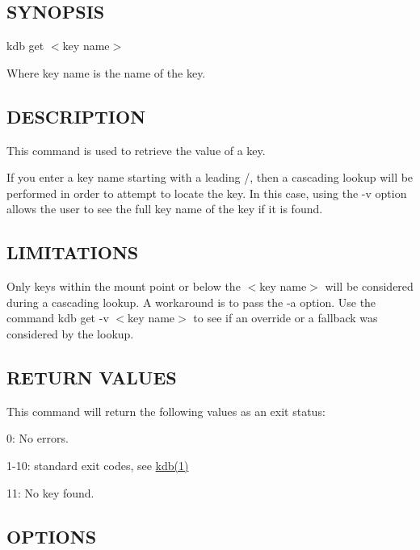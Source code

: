 \subsection*{S\+Y\+N\+O\+P\+S\+IS}

{\ttfamily kdb get $<$key name$>$}

Where {\ttfamily key name} is the name of the key.

\subsection*{D\+E\+S\+C\+R\+I\+P\+T\+I\+ON}

This command is used to retrieve the value of a key.

If you enter a {\ttfamily key name} starting with a leading {\ttfamily /}, then a cascading lookup will be performed in order to attempt to locate the key. In this case, using the {\ttfamily -\/v} option allows the user to see the full key name of the key if it is found.

\subsection*{L\+I\+M\+I\+T\+A\+T\+I\+O\+NS}

Only keys within the mount point or below the {\ttfamily $<$key name$>$} will be considered during a cascading lookup. A workaround is to pass the {\ttfamily -\/a} option. Use the command {\ttfamily kdb get -\/v $<$key name$>$} to see if an override or a fallback was considered by the lookup.

\subsection*{R\+E\+T\+U\+RN V\+A\+L\+U\+ES}

This command will return the following values as an exit status\+:


\begin{DoxyItemize}
\item 0\+: No errors.
\item 1-\/10\+: standard exit codes, see \hyperlink{doc_help_kdb_md}{kdb(1)}
\item 11\+: No key found.
\end{DoxyItemize}

\subsection*{O\+P\+T\+I\+O\+NS}


